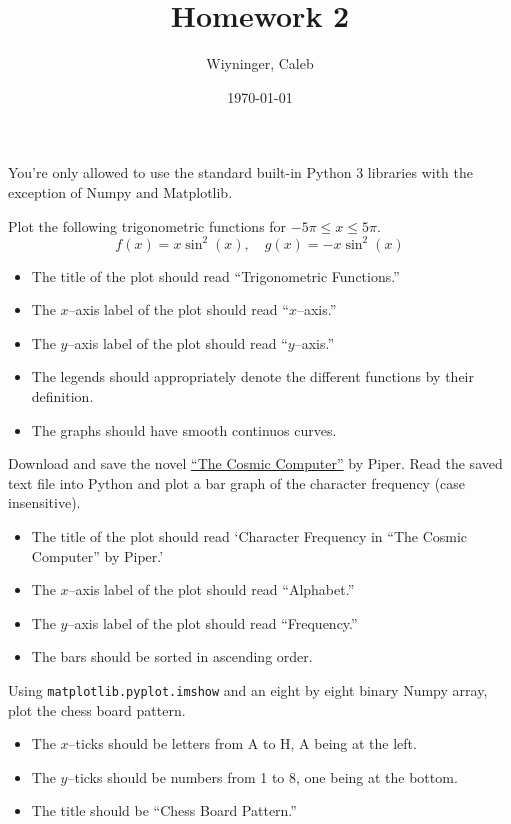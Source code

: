 \documentclass{homework}
\author{Wiyninger, Caleb}  %
\title{Homework 2}
\date{\today}  %
\begin{document}
 \maketitle
You're only allowed to use the standard built-in Python 3
libraries with the exception of Numpy and Matplotlib.

\question Plot the following trigonometric functions for $-5\pi \leq x \leq 5\pi$.
\[
  f(x) = x\sin^2(x), \quad  g(x) = -x\sin^2(x)
\]
\begin{itemize}
  \item The title of the plot should read ``Trigonometric Functions.''
  \item The $x$--axis label of the plot should read ``$x$--axis.''
  \item The $y$--axis label of the plot should read ``$y$--axis.''
  \item The legends should appropriately denote the different functions by their definition.
  \item The graphs should have smooth continuos curves.
\end{itemize}

\question Download and save the novel
\href{https://www.gutenberg.org/files/20727/20727.txt}{``The Cosmic
  Computer''} by Piper. Read the saved text file into Python and plot
a bar graph of the character frequency (case insensitive).

\begin{itemize}
  \item The title of the plot should read `Character Frequency in ``The Cosmic Computer'' by Piper.'
  \item The $x$--axis label of the plot should read ``Alphabet.''
  \item The $y$--axis label of the plot should read ``Frequency.''
  \item The bars should be sorted in ascending order.
\end{itemize}

\question Using \texttt{matplotlib.pyplot.imshow} and an eight by eight binary Numpy array, plot the chess board pattern.

\begin{itemize}
  \item The $x$--ticks should be letters from A to H, A being at the left.
  \item The $y$--ticks should be numbers from 1 to 8, one being at the bottom.
  \item The title should be ``Chess Board Pattern.''
\end{itemize}
\end{document}
